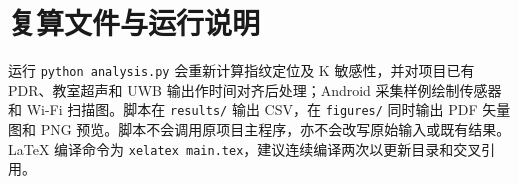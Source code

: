 \appendix
\section{复算文件与运行说明}
运行 \texttt{python analysis.py} 会重新计算指纹定位及 K 敏感性，并对项目已有 PDR、教室超声和 UWB 输出作时间对齐后处理；Android 采集样例绘制传感器和 Wi-Fi 扫描图。脚本在 \texttt{results/} 输出 CSV，在 \texttt{figures/} 同时输出 PDF 矢量图和 PNG 预览。脚本不会调用原项目主程序，亦不会改写原始输入或既有结果。LaTeX 编译命令为 \texttt{xelatex main.tex}，建议连续编译两次以更新目录和交叉引用。
